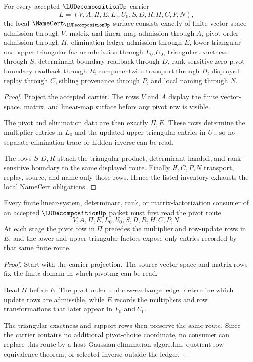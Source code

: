 \begin{theorem}
\label{thm:lu-decomposition-namecert-obligations}
For every accepted $\LUDecompositionUp$ carrier
$$
L=(V,A,\Pi,E,L_0,U_0,S,D,R,H,C,P,N),
$$
the local $\NameCert_{\LUDecompositionUp}$ surface consists exactly of finite vector-space admission through $V$, matrix and linear-map admission through $A$, pivot-order admission through $\Pi$, elimination-ledger admission through $E$, lower-triangular and upper-triangular factor admission through $L_0,U_0$, triangular exactness through $S$, determinant boundary readback through $D$, rank-sensitive zero-pivot boundary readback through $R$, componentwise transport through $H$, displayed replay through $C$, sibling provenance through $P$, and local naming through $N$.
\end{theorem}
\begin{proof}
Project the accepted carrier. The rows $V$ and $A$ display the finite vector-space, matrix, and linear-map surface before any pivot row is visible.

The pivot and elimination data are then exactly $\Pi,E$. These rows determine the multiplier entries in $L_0$ and the updated upper-triangular entries in $U_0$, so no separate elimination trace or hidden inverse can be read.

The rows $S,D,R$ attach the triangular product, determinant handoff, and rank-sensitive boundary to the same displayed route. Finally $H,C,P,N$ transport, replay, source, and name only those rows. Hence the listed inventory exhausts the local NameCert obligations.
\end{proof}

\begin{theorem}
\label{thm:lu-decomposition-pivot-ledger}
Every finite linear-system, determinant, rank, or matrix-factorization consumer of an accepted $\LUDecompositionUp$ packet must first read the pivot route
$$
V,A,\Pi,E,L_0,U_0,S,D,R,H,C,P,N.
$$
At each stage the pivot row in $\Pi$ precedes the multiplier and row-update rows in $E$, and the lower and upper triangular factors expose only entries recorded by that same finite route.
\end{theorem}
\begin{proof}
Start with the carrier projection. The source vector-space and matrix rows fix the finite domain in which pivoting can be read.

Read $\Pi$ before $E$. The pivot order and row-exchange ledger determine which update rows are admissible, while $E$ records the multipliers and row transformations that later appear in $L_0$ and $U_0$.

The triangular exactness and support rows then preserve the same route. Since the carrier contains no additional pivot-choice coordinate, no consumer can replace this route by a host Gaussian-elimination algorithm, quotient row-equivalence theorem, or selected inverse outside the ledger.
\end{proof}

